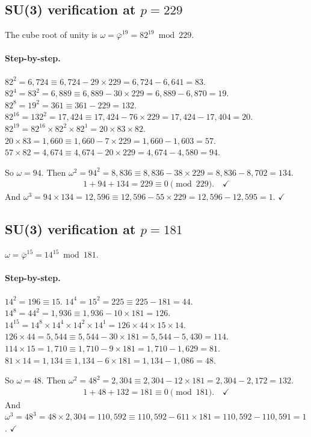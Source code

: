 \documentclass[12pt,oneside]{article}
\theoremstyle{principia}
\theoremstyle{definition}
\theoremstyle{remark}
\begin{document}
\subsection{SU(3) verification at $p = 229$}

The cube root of unity is $\omega = \bar\varphi^{19} = 82^{19} \bmod 229$.

\paragraph{Step-by-step.}
$82^2 = 6{,}724 \equiv 6{,}724 - 29 \times 229 = 6{,}724 - 6{,}641 = 83$.
$82^4 = 83^2 = 6{,}889 \equiv 6{,}889 - 30 \times 229 = 6{,}889 - 6{,}870 = 19$.
$82^8 = 19^2 = 361 \equiv 361 - 229 = 132$.
$82^{16} = 132^2 = 17{,}424 \equiv 17{,}424 - 76 \times 229 = 17{,}424 - 17{,}404 = 20$.
$82^{19} = 82^{16} \times 82^2 \times 82^1 = 20 \times 83 \times 82$.
$20 \times 83 = 1{,}660 \equiv 1{,}660 - 7 \times 229 = 1{,}660 - 1{,}603 = 57$.
$57 \times 82 = 4{,}674 \equiv 4{,}674 - 20 \times 229 = 4{,}674 - 4{,}580 = 94$.

So $\omega = 94$. Then $\omega^2 = 94^2 = 8{,}836 \equiv 8{,}836 - 38 \times 229
= 8{,}836 - 8{,}702 = 134$.
\begin{align}
  1 + 94 + 134 = 229 \equiv 0 \pmod{229}. \quad\checkmark
\end{align}
And $\omega^3 = 94 \times 134 = 12{,}596 \equiv 12{,}596 - 55 \times 229
= 12{,}596 - 12{,}595 = 1$. $\checkmark$

\subsection{SU(3) verification at $p = 181$}

$\omega = \bar\varphi^{15} = 14^{15} \bmod 181$.

\paragraph{Step-by-step.}
$14^2 = 196 \equiv 15$.
$14^4 = 15^2 = 225 \equiv 225 - 181 = 44$.
$14^8 = 44^2 = 1{,}936 \equiv 1{,}936 - 10 \times 181 = 126$.
$14^{15} = 14^8 \times 14^4 \times 14^2 \times 14^1 = 126 \times 44 \times 15 \times 14$.
$126 \times 44 = 5{,}544 \equiv 5{,}544 - 30 \times 181 = 5{,}544 - 5{,}430 = 114$.
$114 \times 15 = 1{,}710 \equiv 1{,}710 - 9 \times 181 = 1{,}710 - 1{,}629 = 81$.
$81 \times 14 = 1{,}134 \equiv 1{,}134 - 6 \times 181 = 1{,}134 - 1{,}086 = 48$.

So $\omega = 48$. Then $\omega^2 = 48^2 = 2{,}304 \equiv 2{,}304 - 12 \times 181
= 2{,}304 - 2{,}172 = 132$.
\begin{align}
  1 + 48 + 132 = 181 \equiv 0 \pmod{181}. \quad\checkmark
\end{align}
And $\omega^3 = 48^3 = 48 \times 2{,}304 = 110{,}592 \equiv
110{,}592 - 611 \times 181 = 110{,}592 - 110{,}591 = 1$. $\checkmark$
\end{document}
